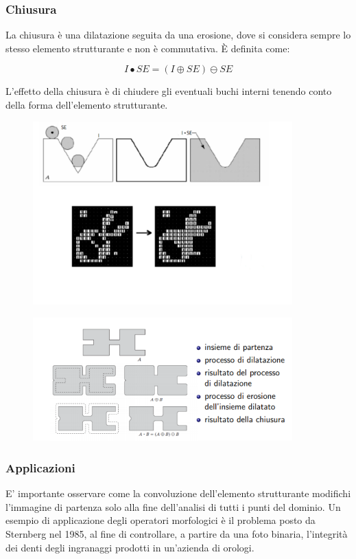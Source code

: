 \subsubsection{Chiusura}

La chiusura è una dilatazione seguita da una erosione, dove si considera sempre lo stesso elemento strutturante e non è
commutativa. È definita come:

$$
    I \bullet SE = (I \oplus SE) \ominus SE
$$

L'effetto della chiusura è di chiudere gli eventuali buchi interni tenendo conto della forma dell'elemento strutturante.

\begin{figure}[H]
    \centering
    \includegraphics[width=10cm, keepaspectratio]{capitoli/immagini/imgs/chiusura.png}
\end{figure}

\begin{figure}[H]
    \centering
    \includegraphics[width=10cm, keepaspectratio]{capitoli/immagini/imgs/chiusura_bella.png}
\end{figure}

\subsubsection{Applicazioni}

E' importante osservare come la convoluzione dell'elemento strutturante modifichi l'immagine di partenza solo alla fine
dell'analisi di tutti i punti del dominio. Un esempio di applicazione degli operatori morfologici è il problema posto da Sternberg nel 1985, al fine di controllare, a
partire da una foto binaria, l'integrità dei denti degli ingranaggi prodotti in un'azienda di orologi.

